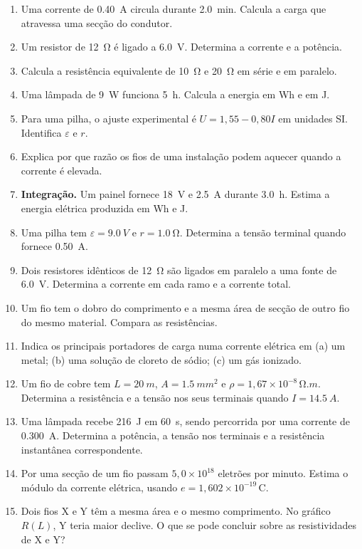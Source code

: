 \documentclass[11pt,a4paper,oneside]{book}
\begin{document}
\begin{exercicios}
\begin{enumerate}
  \item Uma corrente de \SI{0.40}{A} circula durante \SI{2.0}{min}. Calcula a carga que atravessa uma secção do condutor.
  \item Um resistor de \SI{12}{\ohm} é ligado a \SI{6.0}{V}. Determina a corrente e a potência.
  \item Calcula a resistência equivalente de \SI{10}{\ohm} e \SI{20}{\ohm} em série e em paralelo.
  \item Uma lâmpada de \SI{9}{W} funciona \SI{5}{h}. Calcula a energia em Wh e em J.
  \item Para uma pilha, o ajuste experimental é $U=1{,}55-0{,}80I$ em unidades SI. Identifica $\varepsilon$ e $r$.
  \item Explica por que razão os fios de uma instalação podem aquecer quando a corrente é elevada.
  \item \textbf{Integração.} Um painel fornece \SI{18}{V} e \SI{2.5}{A} durante \SI{3.0}{h}. Estima a energia elétrica produzida em Wh e J.
  \item Uma pilha tem $\varepsilon=\SI{9.0}{V}$ e $r=\SI{1.0}{\ohm}$. Determina a tensão terminal quando fornece \SI{0.50}{A}.
  \item Dois resistores idênticos de \SI{12}{\ohm} são ligados em paralelo a uma fonte de \SI{6.0}{V}. Determina a corrente em cada ramo e a corrente total.
  \item Um fio tem o dobro do comprimento e a mesma área de secção de outro fio do mesmo material. Compara as resistências.
  \item Indica os principais portadores de carga numa corrente elétrica em (a) um metal; (b) uma solução de cloreto de sódio; (c) um gás ionizado.
  \item Um fio de cobre tem $L=\SI{20}{m}$, $A=\SI{1.5}{mm^2}$ e $\rho=1{,}67\times10^{-8}\,\si{\ohm.m}$. Determina a resistência e a tensão nos seus terminais quando $I=\SI{14.5}{A}$.
  \item Uma lâmpada recebe \SI{216}{J} em \SI{60}{s}, sendo percorrida por uma corrente de \SI{0.300}{A}. Determina a potência, a tensão nos terminais e a resistência instantânea correspondente.
  \item Por uma secção de um fio passam $5{,}0\times10^{18}$ eletrões por minuto. Estima o módulo da corrente elétrica, usando $e=1{,}602\times10^{-19}\,\mathrm{C}$.
  \item Dois fios X e Y têm a mesma área e o mesmo comprimento. No gráfico $R(L)$, Y teria maior declive. O que se pode concluir sobre as resistividades de X e Y?
\end{enumerate}
\end{exercicios}
\end{document}
